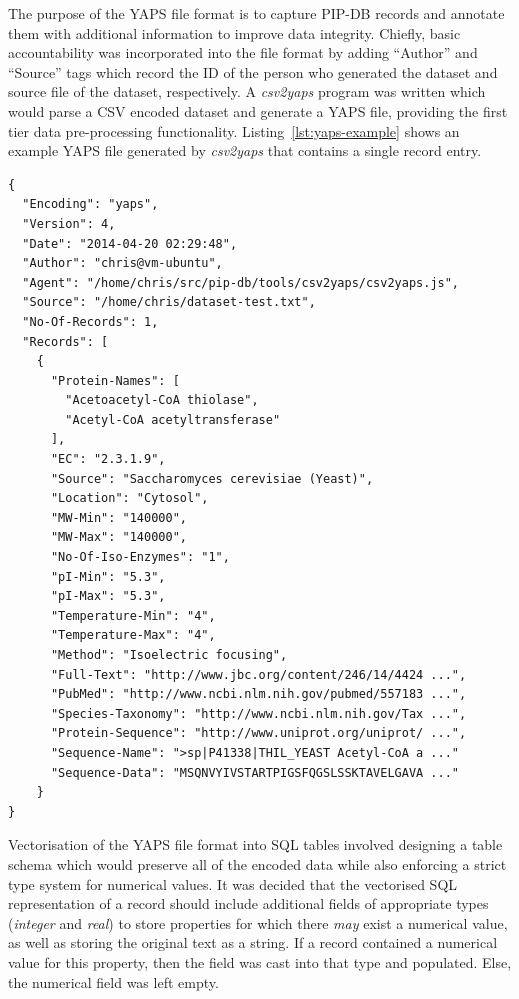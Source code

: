 The purpose of the YAPS file format is to capture PIP-DB records and
annotate them with additional information to improve data
integrity. Chiefly, basic accountability was incorporated into the
file format by adding ``Author'' and ``Source'' tags which record the
ID of the person who generated the dataset and source file of the
dataset, respectively. A \textit{csv2yaps} program was written which
would parse a CSV encoded dataset and generate a YAPS file, providing
the first tier data pre-processing
functionality. Listing~\ref{lst:yaps-example} shows an example YAPS
file generated by \textit{csv2yaps} that contains a single record
entry.\\


\lstset{language=JavaScript}
\begin{lstlisting}[label=lst:yaps-example,caption={%
      [Example YAPS encoded dataset]
      An example YAPS encoded dataset, containing a single record.}]
{
  "Encoding": "yaps",
  "Version": 4,
  "Date": "2014-04-20 02:29:48",
  "Author": "chris@vm-ubuntu",
  "Agent": "/home/chris/src/pip-db/tools/csv2yaps/csv2yaps.js",
  "Source": "/home/chris/dataset-test.txt",
  "No-Of-Records": 1,
  "Records": [
    {
      "Protein-Names": [
        "Acetoacetyl-CoA thiolase",
        "Acetyl-CoA acetyltransferase"
      ],
      "EC": "2.3.1.9",
      "Source": "Saccharomyces cerevisiae (Yeast)",
      "Location": "Cytosol",
      "MW-Min": "140000",
      "MW-Max": "140000",
      "No-Of-Iso-Enzymes": "1",
      "pI-Min": "5.3",
      "pI-Max": "5.3",
      "Temperature-Min": "4",
      "Temperature-Max": "4",
      "Method": "Isoelectric focusing",
      "Full-Text": "http://www.jbc.org/content/246/14/4424 ...",
      "PubMed": "http://www.ncbi.nlm.nih.gov/pubmed/557183 ...",
      "Species-Taxonomy": "http://www.ncbi.nlm.nih.gov/Tax ...",
      "Protein-Sequence": "http://www.uniprot.org/uniprot/ ...",
      "Sequence-Name": ">sp|P41338|THIL_YEAST Acetyl-CoA a ..."
      "Sequence-Data": "MSQNVYIVSTARTPIGSFQGSLSSKTAVELGAVA ..."
    }
}
\end{lstlisting}


Vectorisation of the YAPS file format into SQL tables involved
designing a table schema which would preserve all of the encoded data
while also enforcing a strict type system for numerical values. It was
decided that the vectorised SQL representation of a record should
include additional fields of appropriate types (\textit{integer} and
\textit{real}) to store properties for which there \textit{may} exist
a numerical value, as well as storing the original text as a
string. If a record contained a numerical value for this property,
then the field was cast into that type and populated. Else, the
numerical field was left empty.

